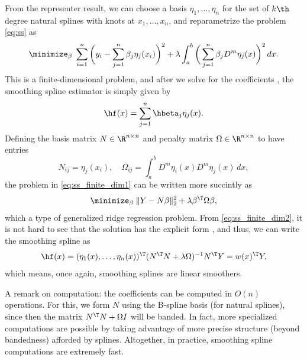 \documentclass{article}
\begin{document}
From the representer result, we can choose a basis $\eta_1,\dots,\eta_n$ for the
set of $k\th$ degree natural splines with knots at $x_1,\dots,x_n$, and
reparametrize the problem \eqref{eq:ss} as  
\begin{equation}
\label{eq:ss_finite_dim1}
\minimize_\beta \; \sum_{i=1}^n \bigg( y_i - \sum_{j=1}^n \beta_j \eta_j(x_i)
\bigg)^2 + \lambda \int_a^b \bigg( \sum_{j=1}^n \beta_j D^m \eta_j(x) \bigg)^2
\, dx.  
\end{equation}
This is a finite-dimensional problem, and after we solve for the coefficients
, the smoothing spline estimator is simply given by  
\[
\hf(x) = \sum_{j=1}^n \hbeta_j \eta_j(x).
\]
Defining the basis matrix $N \in \R^{n \times n}$ and penalty matrix $\Omega \in
\R^{n \times n}$ to have entries
\[
N_{ij} = \eta_j(x_i), \quad 
\Omega_{ij} = \int_a^b D^m \eta_i(x) D^m \eta_j(x) \, dx,
\]
the problem in \eqref{eq:ss_finite_dim1} can be written more succintly as 
\begin{equation}
\label{eq:ss_finite_dim2}
\minimize_\beta \; \|Y - N\beta\|_2^2 + \lambda \beta^\T \Omega \beta,   
\end{equation}
which a type of generalized ridge regression problem. From
\eqref{eq:ss_finite_dim2}, it is not hard to see that the solution has the
explicit form , and
thus, we can write the smoothing spline as    
\[
\hf(x) = (\eta_1(x),\dots,\eta_n(x))^\T (N^\T N + \lambda \Omega)^{-1} N^\T Y =
w(x)^\T Y,   
\]
which means, once again, smoothing splines are linear smoothers.

A remark on computation: the coefficients  can be computed in $O(n)$ operations. For this, we form  
$N$ using the B-spline basis (for natural splines), since then the matrix $N^\T
N + \Omega I$ will be banded. In fact, more specialized computations are
possible by taking advantage of more precise structure (beyond bandedness)
afforded by splines. Altogether, in practice, smoothing spline computations are 
extremely fast. 

\end{document}
